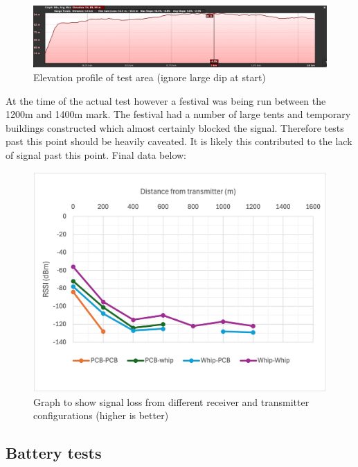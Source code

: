 \begin{figure}[H]
    \centering
    \includegraphics[width=1\textwidth]{contents/23-hw-development/23-fig/range-test-elevation-profile.jpg}
    \caption{Elevation profile of test area (ignore large dip at start)}
    \label{fig:range-test-elevation}
\end{figure}

At the time of the actual test however a festival was being run between the
1200m and 1400m mark. The festival had a number of large tents and temporary
buildings constructed which almost certainly blocked the signal. Therefore tests
past this point should be heavily caveated. It is likely this contributed to the
lack of signal past this point. Final data below:

\begin{figure}[H]
    \centering
    \includegraphics[width=1\textwidth]{contents/23-hw-development/23-fig/distance-graph.jpg}
    \caption{Graph to show signal loss from different receiver and transmitter configurations (higher is better)}
    \label{fig:range-test-elevation}
\end{figure}

\subsection{Battery tests}

